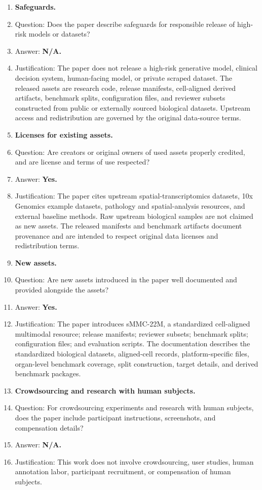 \documentclass{article}
\begin{document}
\begin{enumerate}[leftmargin=*]
\item \textbf{Safeguards.}
    \item[] Question: Does the paper describe safeguards for responsible release of high-risk models or datasets?
    \item[] Answer: \textbf{N/A.}
    \item[] Justification: The paper does not release a high-risk generative model, clinical decision system, human-facing model, or private scraped dataset. The released assets are research code, release manifests, cell-aligned derived artifacts, benchmark splits, configuration files, and reviewer subsets constructed from public or externally sourced biological datasets. Upstream access and redistribution are governed by the original data-source terms.

\item \textbf{Licenses for existing assets.}
    \item[] Question: Are creators or original owners of used assets properly credited, and are license and terms of use respected?
    \item[] Answer: \textbf{Yes.}
    \item[] Justification: The paper cites upstream spatial-transcriptomics datasets, 10x Genomics example datasets, pathology and spatial-analysis resources, and external baseline methods. Raw upstream biological samples are not claimed as new assets. The released manifests and benchmark artifacts document provenance and are intended to respect original data licenses and redistribution terms.

\item \textbf{New assets.}
    \item[] Question: Are new assets introduced in the paper well documented and provided alongside the assets?
    \item[] Answer: \textbf{Yes.}
    \item[] Justification: The paper introduces sMMC-22M, a standardized cell-aligned multimodal resource; release manifests; reviewer subsets; benchmark splits; configuration files; and evaluation scripts. The documentation describes the standardized biological datasets, aligned-cell records, platform-specific files, organ-level benchmark coverage, split construction, target details, and derived benchmark packages.

\item \textbf{Crowdsourcing and research with human subjects.}
    \item[] Question: For crowdsourcing experiments and research with human subjects, does the paper include participant instructions, screenshots, and compensation details?
    \item[] Answer: \textbf{N/A.}
    \item[] Justification: This work does not involve crowdsourcing, user studies, human annotation labor, participant recruitment, or compensation of human subjects.


\end{enumerate}
\end{document}
